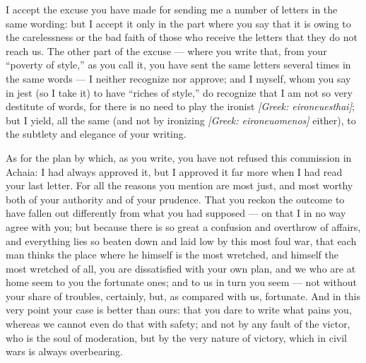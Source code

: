 

 I accept the excuse you have made for sending me a number of letters in the same wording: but I accept it only in the part where you say that it is owing to the carelessness or the bad faith of those who receive the letters that they do not reach us. The other part of the excuse --- where you write that, from your ``poverty of style,'' as you call it, you have sent the same letters several times in the same words --- I neither recognize nor approve; and I myself, whom you say in jest (so I take it) to have ``riches of style,'' do recognize that I am not so very destitute of words, for there is no need to play the ironist \textit{[Greek: eironeuesthai]}; but I yield, all the same (and not by ironizing \textit{[Greek: eironeuomenos]} either), to the subtlety and elegance of your writing.

 As for the plan by which, as you write, you have not refused this commission in Achaia: I had always approved it, but I approved it far more when I had read your last letter. For all the reasons you mention are most just, and most worthy both of your authority and of your prudence. That you reckon the outcome to have fallen out differently from what you had supposed --- on that I in no way agree with you; but because there is so great a confusion and overthrow of affairs, and everything lies so beaten down and laid low by this most foul war, that each man thinks the place where he himself is the most wretched, and himself the most wretched of all, you are dissatisfied with your own plan, and we who are at home seem to you the fortunate ones; and to us in turn you seem --- not without your share of troubles, certainly, but, as compared with us, fortunate. And in this very point your case is better than ours: that you dare to write what pains you, whereas we cannot even do that with safety; and not by any fault of the victor, who is the soul of moderation, but by the very nature of victory, which in civil wars is always overbearing.


